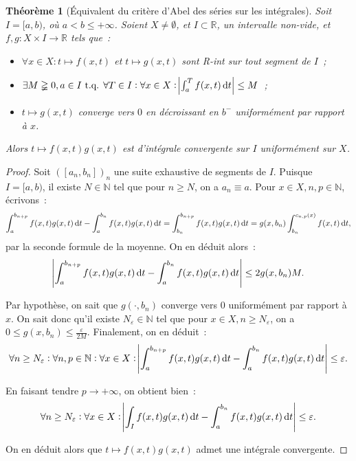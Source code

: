 \documentclass{report}
\newtheorem{thm}{Théorème}[chapter]
\theoremstyle{definition}
\theoremstyle{remark}
\numberwithin{equation}{section}
\newcommand{\R}{\mathbb R}
\newcommand{\N}{\mathbb N}
\newcommand{\tq}{\text{ t.q. }}
\newcommand{\pinfty}{{+\infty}}
\begin{document}
			\begin{thm}[Équivalent du critère d'Abel des séries sur les intégrales] Soit $I = [a, b)$, où $a < b \leq \pinfty$. Soient $X \neq \emptyset$, et
			$I \subset \R$, un intervalle non-vide, et $f, g : X \times I \to \R$ tels que~:
			\begin{itemize}
				\item $\forall x \in X : t \mapsto f(x, t)$ et $t \mapsto g(x, t)$ sont R-int sur tout segment de $I$~;
				\item $\exists M \gneqq 0, a \in I \tq \forall T \in I : \forall x \in X : \abs {\int_a^T f(x, t)\dif t} \leq M$~;
				\item $t \mapsto g(x, t)$ converge vers $0$ en décroissant en $b^-$ uniformément par rapport à $x$.
			\end{itemize}

			Alors $t \mapsto f(x, t)g(x, t)$ est d'intégrale convergente sur $I$ uniformément sur $X$.
			\end{thm}

			\begin{proof} Soit $([a_n, b_n])_n$ une suite exhaustive de segments de $I$. Puisque $I = [a, b)$, il existe $N \in \N$ tel que pour $n \geq N$, on
			a $a_n \equiv a$. Pour $x \in X, n, p \in \N$, écrivons~:
			\begin{equation}
				\int_a^{b_{n+p}}f(x, t)g(x, t)\dif t - \int_a^{b_n}f(x, t)g(x, t)\dif t = \int_{b_n}^{b_{n+p}}f(x, t)g(x, t)\dif t
				= g(x, b_n)\int_{b_n}^{c_{n, p}(x)}f(x, t)\dif t,
			\end{equation}
			par la seconde formule de la moyenne. On en déduit alors~:
			\begin{equation}
				\abs {\int_a^{b_{n+p}}f(x, t)g(x, t)\dif t - \int_a^{b_n}f(x, t)g(x, t)\dif t} \leq 2g(x, b_n)M.
			\end{equation}

			Par hypothèse, on sait que $g(\cdot, b_n)$ converge vers $0$ uniformément par rapport à $x$. On sait donc qu'il existe $N_\varepsilon \in \N$
			tel que pour $x \in X, n \geq N_\varepsilon$, on a $0 \leq g(x, b_n) \leq \frac \varepsilon{2M}$. Finalement, on en déduit~:
			\begin{equation}
				\forall n \geq N_\varepsilon : \forall n, p \in \N : \forall x \in X : \abs {\int_a^{b_{n+p}}f(x, t)g(x, t)\dif t - \int_a^{b_n}f(x, t)g(x, t)\dif t}
				\leq \varepsilon.
			\end{equation}

			En faisant tendre $p \to \pinfty$, on obtient bien~:
			\begin{equation}
				\forall n \geq N_\varepsilon : \forall x \in X : \abs {\int_If(x, t)g(x, t)\dif t - \int_a^{b_n}f(x, t)g(x, t)\dif t} \leq \varepsilon.
			\end{equation}

			On en déduit alors que $t \mapsto f(x, t)g(x, t)$ admet une intégrale convergente.
			\end{proof}
\end{document}

